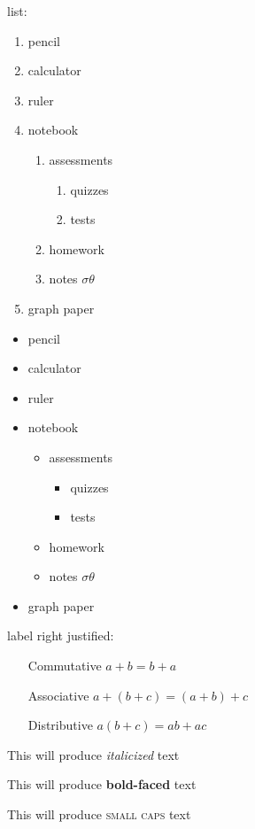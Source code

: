 \documentclass[11pt]{article}
\begin{document}
list:

\begin{enumerate}
\item pencil
\item calculator
\item ruler
\item notebook
	\begin{enumerate}
	\item assessments
		\begin{enumerate}
		\item quizzes
		\item tests
		\end{enumerate}
	\item homework
	\item notes $\sigma\theta$
	\end{enumerate}
\item graph paper
\end{enumerate}

\begin{itemize}
\item pencil
\item calculator
\item ruler
\item notebook
	\begin{itemize}
	\item assessments
		\begin{itemize}
		\item quizzes
		\item tests
		\end{itemize}
	\item homework
	\item notes $\sigma\theta$
	\end{itemize}
\item graph paper
\end{itemize}

label right justified:

\begin{enumerate}
\item[Commutative] $a+b=b+a$
\item[Associative] $a+(b+c)=(a+b)+c$
\item[Distributive] $a(b+c)=ab+ac$
\end{enumerate}

This will produce \textit{italicized} text

This will produce \textbf{bold-faced} text

This will produce \textsc{small caps} text
\end{document}
